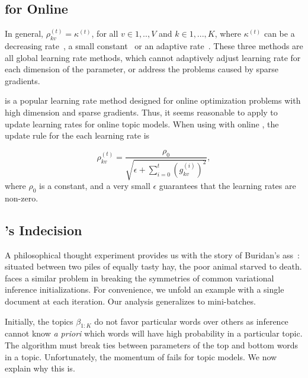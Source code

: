\subsection{ for Online }

In general, $\rho_{kv}^{(t)} = \kappa^{(t)}$, for all $v \in {1,..,V}$ and $k
\in {1,...,K}$, where $\kappa^{(t)}$ can be a decreasing rate~\cite{hoffman2013stochastic}, a small constant~\cite{collobert2011natural} or an adaptive
rate~\cite{ranganath2013adaptive}. These three methods are all global learning
rate methods, which cannot adaptively adjust learning rate for each dimension
of the parameter, or address the problems caused by sparse gradients.

 is a popular learning rate method designed for online
optimization problems with high dimension and sparse gradients. Thus, it seems
reasonable to apply  to update learning rates for online topic
models. When using  \cite{duchi2011adaptive} with online
, the update rule for the each learning rate is

\begin{equation}
\rho_{kv}^{(t)} = \frac{\rho_0}{\sqrt{\epsilon + \sum_{i=0}^{t}\left( g_{kv}^{(i)} \right)^2}},
\end{equation}
where $\rho_0$ is a constant, and a very small $\epsilon$ guarantees that the learning rates are non-zero.

\subsection{'s Indecision}

A philosophical thought experiment provides us with the story of Buridan's
ass~\cite{bayle-1826}: situated between two piles of equally tasty hay, the
poor animal starved to death.   faces a similar problem in
breaking the symmetries of common variational inference initializations. For
convenience, we unfold an example with a single document at each iteration. Our
analysis generalizes to mini-batches.

Initially, the topics $\beta_{1:K}$ do not favor particular words over
others as inference cannot know \textit{a priori} which words will have high
probability in a particular topic.
The algorithm must break ties between parameters of the top and
bottom words in a topic.
Unfortunately, the momentum of  fails for topic models.
We now explain why this is.

